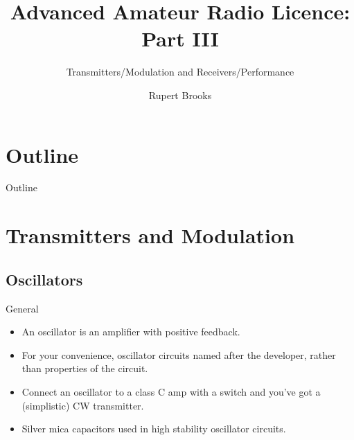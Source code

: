 \documentclass{beamer}
\title{Advanced Amateur Radio Licence: Part III}
\subtitle{Transmitters/Modulation and Receivers/Performance}
\author{Rupert Brooks}
\begin{document}
\begin{frame}
\maketitle
\end{frame}



\section*{Outline}

\begin{frame}{Outline}{}
\tableofcontents
\end{frame}
\section{Transmitters and Modulation}

\subsection{Oscillators}
\begin{frame}{General}{}
\begin{itemize}
\item An oscillator is an amplifier with positive feedback.
\item For your convenience, oscillator circuits named after the developer, rather than properties of the circuit.
\item Connect an oscillator to a class C amp with a switch and you've got a (simplistic) CW transmitter.
\item Silver mica capacitors used in high stability oscillator circuits.
\end{itemize}
\end{frame}
\end{document}
